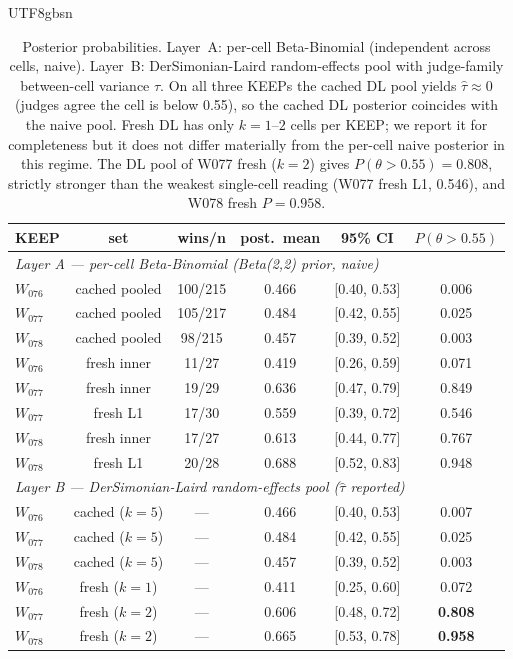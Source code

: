 \documentclass{article}
\begin{document}
\begin{CJK*}{UTF8}{gbsn}
\begin{table}[h]
  \centering\small
  \begin{tabular}{l c c c c c}
    \toprule
    KEEP & set & wins/n & post.\ mean & 95\% CI & \(P(\theta>0.55)\) \\
    \midrule
    \multicolumn{6}{l}{\emph{Layer A --- per-cell Beta-Binomial (Beta(2,2) prior, naive)}} \\
    \(W_{076}\) & cached pooled & 100/215 & 0.466 & [0.40, 0.53] & 0.006 \\
    \(W_{077}\) & cached pooled & 105/217 & 0.484 & [0.42, 0.55] & 0.025 \\
    \(W_{078}\) & cached pooled &  98/215 & 0.457 & [0.39, 0.52] & 0.003 \\
    \(W_{076}\) & fresh inner   & 11/27   & 0.419 & [0.26, 0.59] & 0.071 \\
    \(W_{077}\) & fresh inner   & 19/29   & 0.636 & [0.47, 0.79] & 0.849 \\
    \(W_{077}\) & fresh L1      & 17/30   & 0.559 & [0.39, 0.72] & 0.546 \\
    \(W_{078}\) & fresh inner   & 17/27   & 0.613 & [0.44, 0.77] & 0.767 \\
    \(W_{078}\) & fresh L1      & 20/28   & 0.688 & [0.52, 0.83] & 0.948 \\
    \midrule
    \multicolumn{6}{l}{\emph{Layer B --- DerSimonian-Laird random-effects pool (\(\hat\tau\) reported)}} \\
    \(W_{076}\) & cached (\(k{=}5\)) & --- & 0.466 & [0.40, 0.53] & 0.007 \\
    \(W_{077}\) & cached (\(k{=}5\)) & --- & 0.484 & [0.42, 0.55] & 0.025 \\
    \(W_{078}\) & cached (\(k{=}5\)) & --- & 0.457 & [0.39, 0.52] & 0.003 \\
    \(W_{076}\) & fresh (\(k{=}1\))  & --- & 0.411 & [0.25, 0.60] & 0.072 \\
    \(W_{077}\) & fresh (\(k{=}2\))  & --- & 0.606 & [0.48, 0.72] & \textbf{0.808} \\
    \(W_{078}\) & fresh (\(k{=}2\))  & --- & 0.665 & [0.53, 0.78] & \textbf{0.958} \\
    \bottomrule
  \end{tabular}
  \caption{Posterior probabilities. Layer~A: per-cell
    Beta-Binomial (independent across cells, naive). Layer~B:
    DerSimonian-Laird random-effects pool with judge-family
    between-cell variance \(\tau\). On all three KEEPs the cached
    DL pool yields \(\hat\tau \approx 0\) (judges agree the cell
    is below 0.55), so the cached DL posterior coincides with the
    naive pool. Fresh DL has only \(k{=}1\)--\(2\) cells per KEEP;
    we report it for completeness but it does not differ
    materially from the per-cell naive posterior in this regime.
    The DL pool of W077 fresh (\(k{=}2\)) gives
    \(P(\theta > 0.55) = 0.808\), strictly stronger than the
    weakest single-cell reading (W077 fresh L1, 0.546), and W078
    fresh \(P = 0.958\).}
  \label{tab:exp49-bayes}
\end{table}


\end{CJK*}
\end{document}
